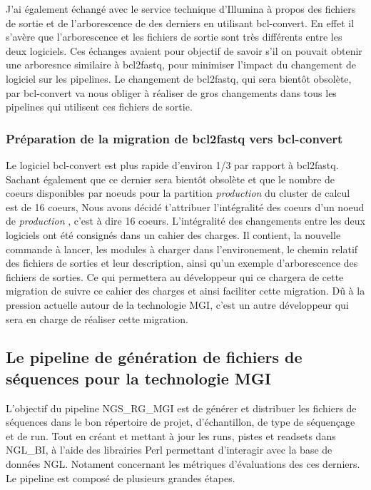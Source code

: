 J'ai également échangé avec le service technique d'Illumina à propos des fichiers de sortie et de l'arborescence de des derniers en utilisant bcl-convert. En effet il s'avère que l'arborescence et les fichiers de sortie sont très différents entre les deux logiciels. Ces échanges avaient pour objectif de savoir s'il on pouvait obtenir une arboresnce similaire à bcl2fastq, pour minimiser l'impact du changement de logiciel sur les pipelines. Le changement de bcl2fastq, qui sera bientôt obsolète, par bcl-convert va nous obliger à réaliser de gros changements dans tous les pipelines qui utilisent ces fichiers de sortie.

\subsubsection{Préparation de la migration de bcl2fastq vers bcl-convert}
Le logiciel bcl-convert est plus rapide d'environ 1/3 par rapport à bcl2fastq. Sachant également que ce dernier sera bientôt obsolète et que le nombre de coeurs disponibles par noeuds pour la partition \og \emph{production} \fg{} du cluster de calcul est de 16 coeurs, Nous avons décidé t'attribuer l'intégralité des coeurs d'un noeud de \og\emph{production} \fg{}, c'est à dire 16 coeurs. L'intégralité des changements entre les deux logiciels ont été consignés dans un cahier des charges. Il contient, la nouvelle commande à lancer, les modules à charger dans l'environement, le chemin relatif des fichiers de sorties et leur description, ainsi qu'un exemple d'arborescence des fichiers de sorties. Ce qui permettera au développeur qui ce chargera de cette migration de suivre ce cahier des charges et ainsi faciliter cette migration. Dû à la pression actuelle autour de la technologie MGI, c'est un autre développeur qui sera en charge de réaliser cette migration.


\subsection{Le pipeline de génération de fichiers de séquences pour la technologie MGI}
L'objectif du pipeline NGS\_RG\_MGI est de générer et distribuer les fichiers de séquences dans le bon répertoire de projet, d'échantillon, de type de séquençage et de run.
Tout en créant et mettant à jour les runs, pistes et readsets dans NGL\_BI, à l'aide des librairies Perl permettant d'interagir avec la base de données NGL.
Notament concernant les métriques d'évaluations des ces derniers.
Le pipeline est composé de plusieurs grandes étapes.

